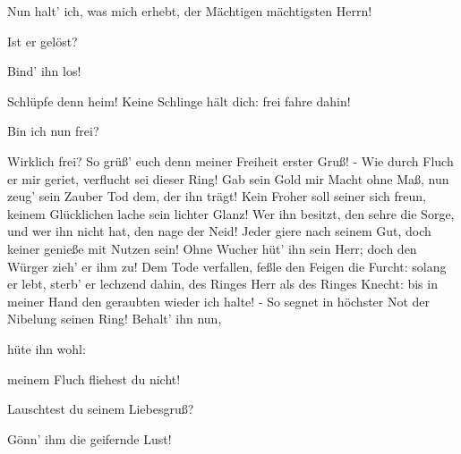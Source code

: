 \begin{drama}
\Wotanspeaks


Nun halt' ich, was mich erhebt,
der Mächtigen mächtigsten Herrn!
 




\Logespeaks
Ist er gelöst?
 

\Wotanspeaks
Bind' ihn los!
 

\Logespeaks


Schlüpfe denn heim!
Keine Schlinge hält dich:
frei fahre dahin!
 

\Alberichspeaks


Bin ich nun frei?
 



Wirklich frei?
So grüß' euch denn
meiner Freiheit erster Gruß! -
Wie durch Fluch er mir geriet,
verflucht sei dieser Ring!
Gab sein Gold mir Macht ohne Maß,
nun zeug' sein Zauber Tod dem, der ihn trägt!
Kein Froher soll seiner sich freun,
keinem Glücklichen lache sein lichter Glanz!
Wer ihn besitzt, den sehre die Sorge,
und wer ihn nicht hat, den nage der Neid!
Jeder giere nach seinem Gut,
doch keiner genieße mit Nutzen sein!
Ohne Wucher hüt' ihn sein Herr;
doch den Würger zieh' er ihm zu!
Dem Tode verfallen, feßle den Feigen die Furcht:
solang er lebt, sterb' er lechzend dahin,
des Ringes Herr als des Ringes Knecht:
bis in meiner Hand den geraubten wieder ich halte! -
So segnet in höchster Not
der Nibelung seinen Ring!
Behalt' ihn nun,
 



hüte ihn wohl:
 



meinem Fluch fliehest du nicht!
 




\Logespeaks
Lauschtest du seinem Liebesgruß?
 

\Wotanspeaks


Gönn' ihm die geifernde Lust!
 



\end{drama}
